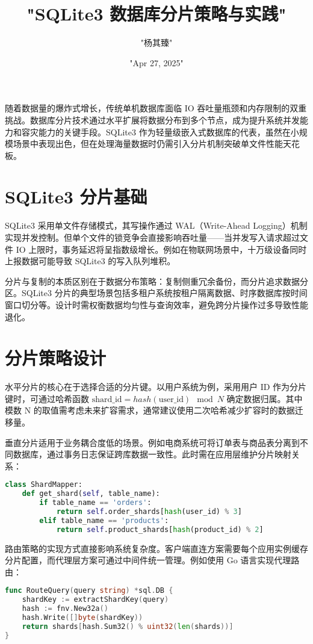 \title{"SQLite3 数据库分片策略与实践"}
\author{"杨其臻"}
\date{"Apr 27, 2025"}
\maketitle
随着数据量的爆炸式增长，传统单机数据库面临 IO 吞吐量瓶颈和内存限制的双重挑战。数据库分片技术通过水平扩展将数据分布到多个节点，成为提升系统并发能力和容灾能力的关键手段。SQLite3 作为轻量级嵌入式数据库的代表，虽然在小规模场景中表现出色，但在处理海量数据时仍需引入分片机制突破单文件性能天花板。\par
\chapter{SQLite3 分片基础}
SQLite3 采用单文件存储模式，其写操作通过 WAL（Write-Ahead Logging）机制实现并发控制。但单个文件的锁竞争会直接影响吞吐量——当并发写入请求超过文件 IO 上限时，事务延迟将呈指数级增长。例如在物联网场景中，十万级设备同时上报数据可能导致 SQLite3 的写入队列堆积。\par
分片与复制的本质区别在于数据分布策略：复制侧重冗余备份，而分片追求数据分区。SQLite3 分片的典型场景包括多租户系统按租户隔离数据、时序数据库按时间窗口切分等。设计时需权衡数据均匀性与查询效率，避免跨分片操作过多导致性能退化。\par
\chapter{分片策略设计}
水平分片的核心在于选择合适的分片键。以用户系统为例，采用用户 ID 作为分片键时，可通过哈希函数 $\text{shard\_id} = hash(\text{user\_id}) \mod N$ 确定数据归属。其中模数 N 的取值需考虑未来扩容需求，通常建议使用二次哈希减少扩容时的数据迁移量。\par
垂直分片适用于业务耦合度低的场景。例如电商系统可将订单表与商品表分离到不同数据库，通过事务日志保证跨库数据一致性。此时需在应用层维护分片映射关系：\par
\begin{lstlisting}[language=python]
class ShardMapper:
    def get_shard(self, table_name):
        if table_name == 'orders':
            return self.order_shards[hash(user_id) % 3]
        elif table_name == 'products':
            return self.product_shards[hash(product_id) % 2]
\end{lstlisting}
路由策略的实现方式直接影响系统复杂度。客户端直连方案需要每个应用实例缓存分片配置，而代理层方案可通过中间件统一管理。例如使用 Go 语言实现代理路由：\par
\begin{lstlisting}[language=go]
func RouteQuery(query string) *sql.DB {
    shardKey := extractShardKey(query)
    hash := fnv.New32a()
    hash.Write([]byte(shardKey))
    return shards[hash.Sum32() % uint32(len(shards))]
}
\end{lstlisting}
